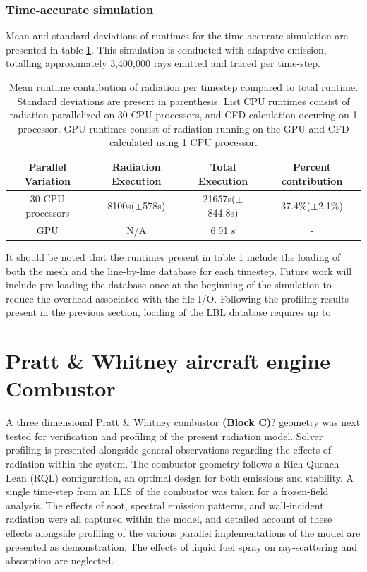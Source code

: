 \subsubsection{Time-accurate simulation}
Mean and standard deviations of runtimes for the time-accurate simulation are presented in table \ref{table:PoolFireTransient_runtime_table_1rpc}. This simulation is conducted with adaptive emission, totalling approximately 3,400,000 rays emitted and traced per time-step.


\begin{table}[h!]
\centering
\begin{tabular}{||c c c c||} 
 \hline
 Parallel Variation & Radiation Execution & Total Execution & Percent contribution \\ [0.5ex] 
 \hline\hline
 30 CPU processors & 8100s($\pm{}$578s) & 21657s($\pm{}$844.8s) & 37.4\%($\pm{}$2.1\%) \\ 
 GPU & N/A & 6.91 s & - \\
 \hline
\end{tabular}
\caption{Mean runtime contribution of radiation per timestep compared to total runtime. Standard deviations are present in parenthesis. List CPU runtimes consist of radiation parallelized on 30 CPU processors, and CFD calculation occuring on 1 processor. GPU runtimes consist of radiation running on the GPU and CFD calculated using 1 CPU processor.}
\label{table:PoolFireTransient_runtime_table_1rpc}
\end{table}

It should be noted that the runtimes present in table \ref{table:PoolFireTransient_runtime_table_1rpc} include the loading of both the mesh and the line-by-line database for each timestep. Future work will include pre-loading the database once at the beginning of the simulation to reduce the overhead associated with the file I/O.
Following the profiling results present in the previous section, loading of the LBL database requires up to 


\section{Pratt \& Whitney aircraft engine Combustor}
A three dimensional Pratt \& Whitney combustor  \textbf{(Block C)}? geometry was next tested for verification and profiling of the present radiation model. Solver profiling is presented alongside general observations regarding the effects of radiation within the system.
The combustor geometry follows a Rich-Quench-Lean (RQL) configuration, an optimal design for both emissions and stability.
A single time-step from an LES of the combustor was taken for a frozen-field analysis. The effects of soot, spectral emission patterns, and wall-incident radiation were all captured within the model, and detailed account of these effects alongside profiling of the various parallel implementations of the model are presented as demonstration.
The effects of liquid fuel spray on ray-scattering and absorption are neglected.

